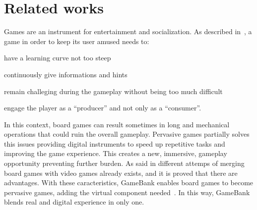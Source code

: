\section{Related works}
\label{related_works}

Games are an instrument for entertainment and socialization. As described 
in~\cite{gee03}, a game in order to keep its user amused needs to:
\begin{enumerate*}[label=\roman*)]
 \item have a learning curve not too steep
 \item continuously give informations and hints
 \item remain challeging during the gameplay without being too much difficult
 \item engage the player as a ``producer'' and not only as a ``consumer''.
\end{enumerate*}
In this context, board games can result sometimes in long and mechanical 
operations that could ruin the overall gameplay. Pervasive games partially 
solves this issues providing digital instruments to speed up repetitive 
tasks and improving the game experience. This creates a new, immersive, 
gameplay opportunity preventing further burden.
As said in\cite{mandryk02} different attemps of merging board games with video 
games already exists, and it is proved that there are advantages.
With these caracteristics, GameBank enables board games to become pervasive 
games, adding the virtual component needed~\cite{arango17}. 
In this way, GameBank blends real and digital experience in only one.
